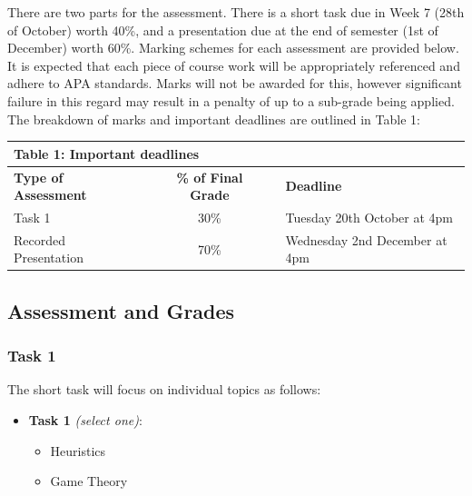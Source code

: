\documentclass[
  x11names]{article}
\providecommand{\tightlist}{%
  \setlength{\itemsep}{0pt}\setlength{\parskip}{0pt}}
\begin{document}
There are two parts for the assessment. There is a short task due in
Week 7 (28th of October) worth 40\%, and a presentation due at the end
of semester (1st of December) worth 60\%. Marking schemes for each
assessment are provided below. It is expected that each piece of course
work will be appropriately referenced and adhere to APA standards. Marks
will not be awarded for this, however significant failure in this regard
may result in a penalty of up to a sub-grade being applied. The
breakdown of marks and important deadlines are outlined in Table 1:

\bigskip

\begin{tabular}{l >{\centering\arraybackslash}m{.5cm} c >{\centering\arraybackslash}m{.5cm} l}
  \multicolumn{5}{l}{\textbf{Table 1:} Important deadlines} \\
  \hline \hline
  \textbf{Type of Assessment}               & & \textbf{\% of Final Grade} & & \textbf{Deadline} \\ \hline
  Task 1                                   & & 30\%                       & & Tuesday 20th October at 4pm \\ \hline
  Recorded Presentation                                     & & 70\%                       & & Wednesday 2nd December at 4pm  \\ \hline \end{tabular}

\bigskip

\subsection{Assessment and Grades}\label{assessment-and-grades}

\subsubsection{Task 1}\label{task-1}

The short task will focus on individual topics as follows:

\begin{itemize}
\tightlist
\item
  \textbf{Task 1} \emph{(select one)}:

  \begin{itemize}
  \tightlist
  \item
    Heuristics
  \item
    Game Theory
  \end{itemize}
\end{itemize}
\end{document}
